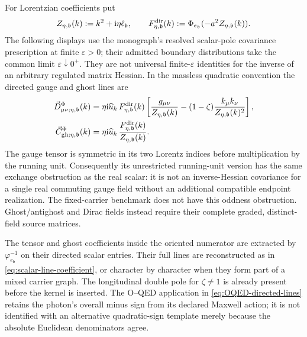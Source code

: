 \documentclass[final,5p,times,twocolumn,numbers,nopreprintline]{elsarticle}
\numberwithin{equation}{section}
\theoremstyle{definition}
\theoremstyle{remark}
\newcommand{\ii}{\mathrm i}
\newcommand{\bb}{\mathfrak b}
\newcommand{\Ph}{\Phi}
\newcommand{\ee}{e_{\bb}}
\newcommand{\epsvec}{\hat\epsilon_{\bb}}
\newcommand{\embed}{\varphi_{\ee}}
\begin{document}
For Lorentzian coefficients put
\begin{equation}
 Z_{\eta,\bb}(k):=k^2+\ii\eta\epsvec,
 \qquad
 F^{\rm dir}_{\eta,\bb}(k):=
              \Ph_{\ee}(-a^2Z_{\eta,\bb}(k)).
 \label{eq:gauge-directed-kinetic-data}
\end{equation}
The following displays use the monograph's resolved scalar-pole
covariance prescription at finite \(\varepsilon>0\); their
admitted boundary distributions take the common limit
\(\varepsilon\downarrow0^+\). They are not universal
finite-\(\varepsilon\) identities for the inverse of an
arbitrary regulated matrix Hessian. In the massless quadratic
convention the directed gauge and ghost lines are
\begin{align}
 \vec D^{\Ph}_{\mu\nu;\eta,\bb}(k)
  &=\eta\ii\widehat u_k\,
      F^{\rm dir}_{\eta,\bb}(k)
       \left[\frac{g_{\mu\nu}}{Z_{\eta,\bb}(k)}
        -(1-\zeta)\frac{k_\mu k_\nu}
                           {Z_{\eta,\bb}(k)^2}\right],
                   \nonumber\\
 \vec C^{\Ph}_{{\rm gh};\eta,\bb}(k)
  &=\eta\ii\widehat u_k\,
      \frac{F^{\rm dir}_{\eta,\bb}(k)}
           {Z_{\eta,\bb}(k)}.
 \label{eq:physical-directed-gauge-ghost-lines}
\end{align}
The gauge tensor is symmetric in its two Lorentz indices before
multiplication by the running unit. Consequently its unrestricted
running-unit version has the same exchange obstruction as the real
scalar: it is not an inverse-Hessian covariance for a single real
commuting gauge field without an additional compatible endpoint
realization. The fixed-carrier benchmark does not have this oddness
obstruction. Ghost/antighost and Dirac fields instead require their
complete graded, distinct-field source matrices.

The tensor and ghost coefficients inside the oriented numerator
are extracted by \(\embed^{-1}\) on their directed scalar
entries. Their full lines are reconstructed as in
\eqref{eq:scalar-line-coefficient}, or character by character
when they form part of a mixed carrier graph. The longitudinal
double pole for \(\zeta\ne1\) is already present before the
kernel is inserted.
The O--QED application in \eqref{eq:OQED-directed-lines} retains the
photon's overall minus sign from its declared Maxwell action; it is not
identified with an alternative quadratic-sign template merely because
the absolute Euclidean denominators agree.
\end{document}
